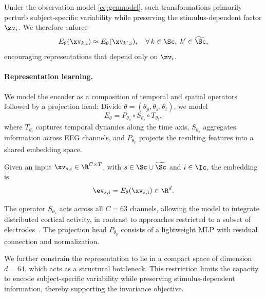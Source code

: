 Under the observation model \eqref{eq:genmodel}, such transformations primarily perturb subject-specific variability while preserving the stimulus-dependent factor $\zv_i$.
We therefore enforce
\begin{equation}
     E_\theta(\xv_{k,i}) \approx E_\theta(\xv_{k',i}), \quad \forall\, k \in \Sc,\; k' \in  \widetilde{\Sc},
\end{equation}
encouraging representations that depend only on $\zv_i$.

\paragraph{Representation learning.}
We model the encoder as a composition of temporal and spatial operators followed by a projection head: Divide $ \theta = (\theta_p, \theta_s, \theta_t)$, we model 
\begin{equation}
E_\theta = P_{\theta_p} \circ S_{\theta_s} \circ T_{\theta_t},
\end{equation}
where $T_{\theta_t}$ captures temporal dynamics along the time axis, $S_{\theta_s}$ aggregates information across EEG channels, and $P_{\theta_p}$ projects the resulting features into a shared embedding space.

Given an input $\xv_{s,i} \in \R^{C \times T}$, with $s\in \Sc \cup \widetilde{\Sc}$ and $i \in \Ic$, the embedding is
\begin{equation}
\ev_{s,i} = E_\theta(\xv_{s,i}) \in \R^d.
\end{equation}

The operator $S_{\theta_s}$ acts across all $C=63$ channels, allowing the model to integrate distributed cortical activity, in contrast to approaches restricted to a subset of electrodes~\cite{du2025shallow}.
The projection head $P_{\theta_p}$ consists of a lightweight MLP with residual connection and normalization.

We further constrain the representation to lie in a compact space of dimension $d=64$, which acts as a structural bottleneck. 
This restriction limits the capacity to encode subject-specific variability while preserving stimulus-dependent information, thereby supporting the invariance objective.
 
